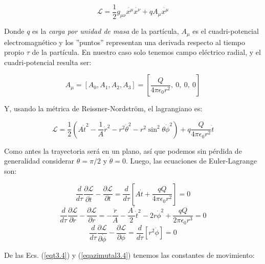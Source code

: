 \begin{equation}
    \mathcal{L} = \frac{1}{2} g_{\mu\nu} \dot{x^\mu}\dot{x^\nu} + q A_\mu \dot{x^\mu}
\end{equation}

Donde $q$ es la \textit{carga por unidad de masa} de la partícula, $A_\mu$ es el cuadri-potencial electromagnético y los ''puntos'' representan una derivada respecto al tiempo propio $\tau$ de la partícula. En nuestro caso solo tenemos campo eléctrico radial, y el cuadri-potencial resulta ser:
  
\begin{equation}
    A_\mu=[A_0,A_1,A_2,A_3]=\left[\frac{Q}{4\pi\epsilon_0 r^2},\ 0,\ 0,\ 0 \right]
\end{equation}

Y, usando la métrica de Reissner-Nordström, el lagrangiano es:

\begin{equation}
    \mathcal{L} = \frac{1}{2}\left( A\dot{t}^2 - \frac{1}{A} \dot{r}^2 - r^2 \dot{\theta}^2 - r^2 \sin^2{\theta} \dot{\phi}^2 \right) + q \frac{Q}{4\pi\epsilon_0 r^2} \dot{t}
\end{equation}

Como antes la trayectoria será en un plano, así que podemos sin pérdida de generalidad considerar $\theta=\pi/2$ y $\dot{\theta}=0$. Luego, las ecuaciones de Euler-Lagrange son:

\begin{equation}
\frac{d}{d\tau}\frac{\partial \mathcal{L}}{\partial \dot{t}} - \frac{\partial \mathcal{L}}{\partial t} = \frac{d}{d\tau}\left[ A\dot{t} + \frac{qQ}{4\pi\epsilon_0 r^2} \right]  = 0
\label{eqt3.4}
\end{equation}
\begin{equation}
    \frac{d}{d\tau}\frac{\partial \mathcal{L}}{\partial \dot{r}} - \frac{\partial \mathcal{L}}{\partial r} = -\frac{\ddot{r}}{A} - \frac{A^\prime}{2} \dot{t}^2 - 2 r \dot{\phi}^2 + \frac{qQ}{2\pi\epsilon_0 r^3}  = 0
\label{eqradial3.4}
\end{equation}
\begin{equation}
    \frac{d}{d\tau}\frac{\partial \mathcal{L}}{\partial \dot{\phi}} - \frac{\partial \mathcal{L}}{\partial \phi} =\frac{d}{d \tau}\left[ r^2 \dot{\phi} \right] = 0
\label{eqazimutal3.4}
\end{equation}

De las Ecs. (\ref{eqt3.4}) y (\ref{eqazimutal3.4}) tenemos las constantes de movimiento:

